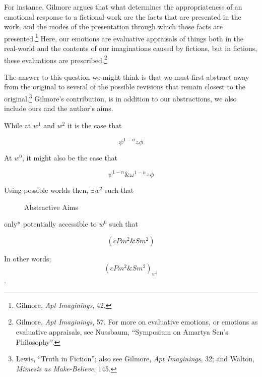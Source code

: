\documentclass[phdthesis,12pt,final]{wuthesis}
\theoremstyle{definition}
\theoremstyle{definition}
\theoremstyle{definition}
\theoremstyle{definition}
\theoremstyle{remark}
\begin{document}
For instance, Gilmore argues that what determines the appropriateness of an emotional response to a fictional work are the facts that are presented in the work, and the modes of the presentation through which those facts are presented.\footnote{Gilmore, \emph{Apt {Imaginings}}, 42.} Here, our emotions are evaluative appraisals of things both in the real-world and the contents of our imaginations caused by fictions, but in fictions, these evaluations are prescribed.\footnote{Gilmore, \emph{Apt {Imaginings}}, 57. For more on evaluative emotions, or emotions as evaluative appraisals, see Nussbaum, {``Symposium on {Amartya Sen}'s Philosophy''}.}

\noindent The answer to this question we might think is that we must first abstract away from the original to several of the possible revisions that remain closest to the original.\footnote{Lewis, {``Truth in {Fiction}''}; also see Gilmore, \emph{Apt {Imaginings}}, 32; and Walton, \emph{Mimesis as {Make-Believe}}, 145.} Gilmore's contribution, is in addition to our abstractions, we also include ours and the author's aims.

While at \(w^{1}\) and \(w^{2}\) it is the case that

\[\psi^{1-n}\therefore\phi\]

\noindent At \(w^{0}\), it might also be the case that

\[\psi^{1-n}\&\omega^{1-n}\therefore\phi\]

\newpage

\noindent Using possible worlds then, \(\exists w^{2}\) such that

\begin{figure}
\centering
{}
\caption{Abstractive Aims}
\label{fig:abstractive-aims}
\end{figure}

\noindent *only* potentially accessible to \(w^{0}\) such that

\[( cPm^{2} \& Sm^{2} )\]

\noindent In other words; \[( cPm^{2} \& Sm^{2} )_{w^{2}}\].
\end{document}
